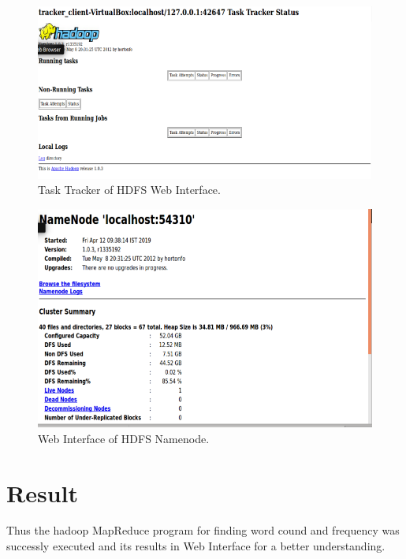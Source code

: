 \documentclass[a4paper,10pt]{article}
\begin{document}
	\begin{figure}[h]
		\includegraphics[scale=0.30,center]{exptTwoScreenShot/fig8.png}
		\caption{Task Tracker of HDFS Web Interface.}
		\label{fig:8}
	\end{figure}

\pagebreak

	\begin{figure}[h]
		\includegraphics[scale=0.30,center]{exptTwoScreenShot/fig9.png}
		\caption{Web Interface of HDFS Namenode.}
		\label{fig:10}
	\end{figure}
  
\section{Result}
Thus the hadoop MapReduce program for finding word cound and frequency was successly executed and its results in Web Interface for a better understanding.
\end{document}

